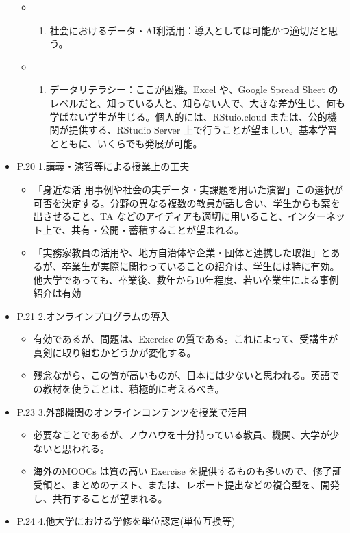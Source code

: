 \documentclass[
]{bxjsbook}
\providecommand{\tightlist}{%
  \setlength{\itemsep}{0pt}\setlength{\parskip}{0pt}}
\theoremstyle{definition}
\theoremstyle{definition}
\theoremstyle{definition}
\theoremstyle{definition}
\theoremstyle{remark}
\begin{document}
\begin{itemize}
  \begin{itemize}
  \item
    \begin{enumerate}
    \def\labelenumi{\arabic{enumi}.}
    \tightlist
    \item
      社会におけるデータ・AI利活用：導入としては可能かつ適切だと思う。
    \end{enumerate}
  \item
    \begin{enumerate}
    \def\labelenumi{\arabic{enumi}.}
    \setcounter{enumi}{1}
    \tightlist
    \item
      データリテラシー：ここが困難。Excel や、Google Spread Sheet のレベルだと、知っている人と、知らない人で、大きな差が生じ、何も学ばない学生が生じる。個人的には、RStuio.cloud または、公的機関が提供する、RStudio Server 上で行うことが望ましい。基本学習とともに、いくらでも発展が可能。
    \end{enumerate}
  \end{itemize}
\item
  P.20 1.講義・演習等による授業上の工夫

  \begin{itemize}
  \tightlist
  \item
    「身近な活 用事例や社会の実データ・実課題を用いた演習」この選択が可否を決定する。分野の異なる複数の教員が話し合い、学生からも案を出させること、TA などのアイディアも適切に用いること、インターネット上で、共有・公開・蓄積することが望まれる。
  \item
    「実務家教員の活用や、地方自治体や企業・団体と連携した取組」とあるが、卒業生が実際に関わっていることの紹介は、学生には特に有効。他大学であっても、卒業後、数年から10年程度、若い卒業生による事例紹介は有効
  \end{itemize}
\item
  P.21 2.オンラインプログラムの導入

  \begin{itemize}
  \tightlist
  \item
    有効であるが、問題は、Exercise の質である。これによって、受講生が真剣に取り組むかどうかが変化する。
  \item
    残念ながら、この質が高いものが、日本には少ないと思われる。英語での教材を使うことは、積極的に考えるべき。
  \end{itemize}
\item
  P.23 3.外部機関のオンラインコンテンツを授業で活用

  \begin{itemize}
  \tightlist
  \item
    必要なことであるが、ノウハウを十分持っている教員、機関、大学が少ないと思われる。
  \item
    海外のMOOCs は質の高い Exercise を提供するものも多いので、修了証受領と、まとめのテスト、または、レポート提出などの複合型を、開発し、共有することが望まれる。
  \end{itemize}
\item
  P.24 4.他大学における学修を単位認定(単位互換等)


\end{itemize}
\end{document}
